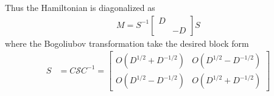 Thus the Hamiltonian is diagonalized as
\begin{equation}\begin{aligned}
M=S^{-1}
\begin{bmatrix}
D \\
& -D
\end{bmatrix}
S
\end{aligned}\end{equation}
where the Bogoliubov transformation take the desired block form
\begin{equation}\begin{aligned}
S&=C\mathcal{S}C^{-1}
=\begin{bmatrix}
O(D^{1/2}+D^{-1/2}) & O(D^{1/2}-D^{-1/2}) \\
O(D^{1/2}-D^{-1/2}) & O(D^{1/2}+D^{-1/2}) 
\end{bmatrix}
\end{aligned}\end{equation}



